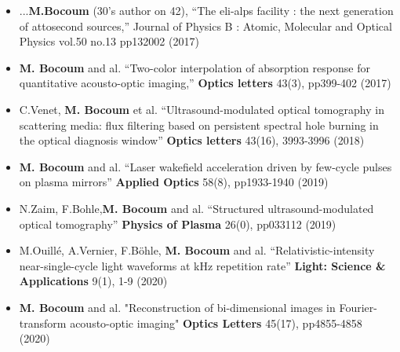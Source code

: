 \documentclass[11pt,a4paper,sans]{moderncv} %
\begin{document}
\begin{itemize}
\item ...\textbf{M.Bocoum} (30's author on 42), “The eli-alps facility : the next generation of attosecond sources,” Journal of Physics B : Atomic, Molecular and Optical Physics vol.50 no.13 pp132002 (2017)

\item  \textbf{M. Bocoum} and al. “Two-color interpolation of absorption response for quantitative acousto-optic imaging,” \textbf{Optics letters} 43(3), pp399-402 (2017)

\item  C.Venet, \textbf{M. Bocoum} et al. “Ultrasound-modulated optical tomography in scattering media: flux filtering based on persistent spectral hole burning in the optical diagnosis window” \textbf{Optics letters} 43(16), 3993-3996 (2018)

\item  \textbf{M. Bocoum} and al. “Laser wakefield acceleration driven by few-cycle pulses on plasma mirrors” \textbf{Applied Optics} 58(8), pp1933-1940 (2019)

\item  N.Zaim, F.Bohle,\textbf{M. Bocoum} and al. “Structured ultrasound-modulated optical tomography” \textbf{Physics of Plasma} 26(0), pp033112 (2019)

\item  M.Ouillé, A.Vernier, F.Böhle, \textbf{M. Bocoum} and al. “Relativistic-intensity near-single-cycle light waveforms at kHz repetition rate” \textbf{Light: Science \& Applications} 9(1), 1-9 (2020)

\item \textbf{M. Bocoum} and al. "Reconstruction of bi-dimensional images in Fourier-transform acousto-optic imaging" \textbf{Optics Letters} 45(17), pp4855-4858 (2020)


\end{itemize}

\end{document}
